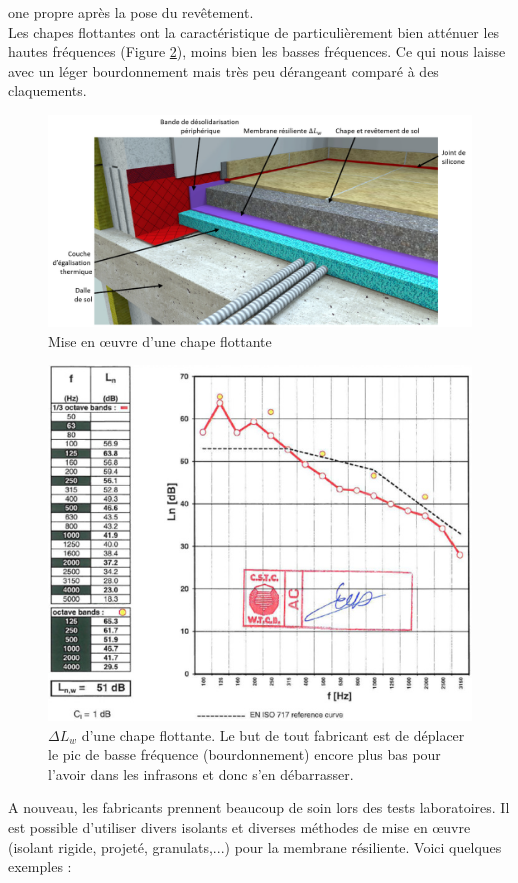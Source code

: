 \documentclass[11pt]{report}
\begin{document}
one propre après la pose du revêtement.  \\

Les chapes flottantes ont la caractéristique de particulièrement bien atténuer les hautes fréquences (Figure \ref{L}), moins bien les basses fréquences. Ce qui nous laisse avec un léger bourdonnement mais très peu dérangeant comparé à des claquements. \\

\begin{figure}[ht]
\centering
\includegraphics[width=\linewidth]{chap}
\caption{Mise en œuvre d'une chape flottante}
\label{flo}
\end{figure}


\begin{figure}
\centering
\includegraphics[width=0.7\linewidth]{cha}
\caption{$\Delta L_w$ d'une chape flottante. Le but de tout fabricant est de déplacer le pic de basse fréquence (bourdonnement) encore plus bas pour l'avoir dans les infrasons et donc s'en débarrasser.}
\label{L}
\end{figure}



A nouveau, les fabricants prennent beaucoup de soin lors des tests laboratoires. Il est possible d'utiliser divers isolants et diverses méthodes de mise en œuvre (isolant rigide, projeté, granulats,...) pour la membrane résiliente. Voici quelques exemples :
\end{document}
